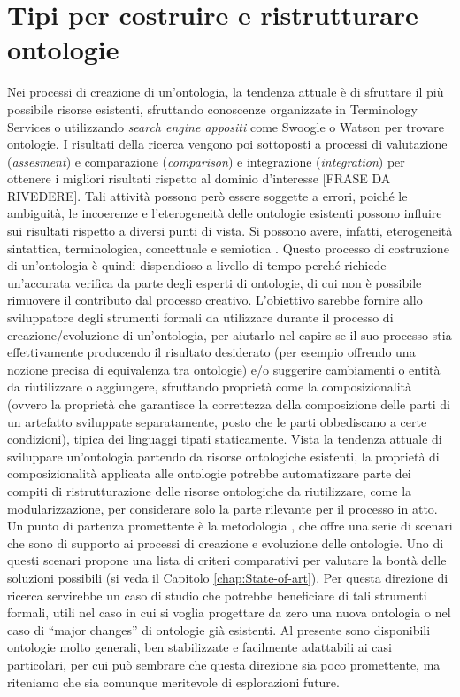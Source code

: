 \section{Tipi per costruire e ristrutturare ontologie}
Nei processi di creazione di un'ontologia, la tendenza attuale è di sfruttare il più possibile risorse esistenti, sfruttando conoscenze organizzate in 
Terminology Services \cite{ledl2016describing,vandenbussche2017linked} o utilizzando \emph{search engine appositi} come 
Swoogle\cite{swoogle} o Watson \cite{watson} per trovare ontologie. I risultati della ricerca vengono poi sottoposti a processi di valutazione 
(\emph{assesment}) e comparazione (\emph{comparison}) e integrazione (\emph{integration}) per ottenere i migliori risultati rispetto al dominio d'interesse 
[FRASE DA RIVEDERE]. Tali attività possono però essere soggette a errori, poiché le ambiguità, le incoerenze e l'eterogeneità delle ontologie esistenti 
possono influire sui risultati rispetto a diversi punti di vista. Si possono avere, infatti, eterogeneità sintattica, terminologica, concettuale e semiotica 
\cite{carriero2020OntoReuse}. Questo processo di costruzione di un'ontologia è quindi dispendioso a livello di tempo perché richiede un'accurata verifica da 
parte degli esperti di ontologie, di cui non è possibile rimuovere il contributo dal processo creativo. L'obiettivo sarebbe fornire allo sviluppatore 
degli strumenti formali da utilizzare durante il processo di creazione/evoluzione di un'ontologia, per aiutarlo nel capire se il suo processo stia effettivamente 
producendo il risultato desiderato (per esempio offrendo una nozione precisa di equivalenza tra ontologie) e/o suggerire cambiamenti o entità da riutilizzare 
o aggiungere, sfruttando proprietà come la composizionalità (ovvero la proprietà che garantisce la correttezza della composizione delle parti di un artefatto 
sviluppate separatamente, posto che le parti obbediscano a certe condizioni), tipica dei linguaggi tipati staticamente. Vista la tendenza attuale di 
sviluppare un'ontologia partendo da risorse ontologiche esistenti, la proprietà di composizionalità applicata alle ontologie potrebbe automatizzare parte dei 
compiti di ristrutturazione delle risorse ontologiche da riutilizzare, come la modularizzazione, per considerare solo la parte rilevante per il processo in 
atto. Un punto di partenza promettente è la metodologia \cite{NeOn}, che offre una serie di scenari che sono di supporto ai processi di creazione e evoluzione 
delle ontologie. Uno di questi scenari propone una lista di criteri comparativi per valutare la bontà delle soluzioni possibili (si veda il Capitolo \ref{chap:State-of-art}).
Per questa direzione di ricerca servirebbe un caso di studio che potrebbe beneficiare di tali strumenti formali, utili nel caso in cui si voglia progettare 
da zero una nuova ontologia o nel caso di “major changes” di ontologie già esistenti. Al presente sono disponibili ontologie molto generali, ben stabilizzate 
e facilmente adattabili ai casi particolari, per cui può sembrare che questa direzione sia poco promettente, ma riteniamo che sia comunque meritevole di 
esplorazioni future.

